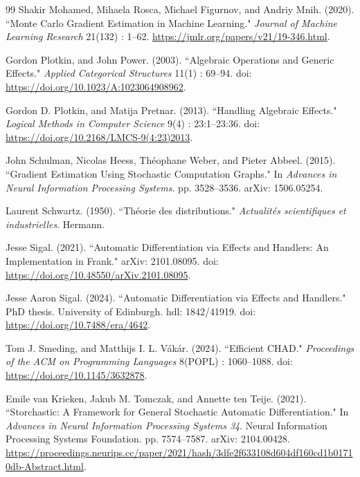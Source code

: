 \documentclass[11pt,a4paper]{article}
\theoremstyle{definition}
\theoremstyle{remark}
\begin{document}
\begin{thebibliography}{99}
Shakir Mohamed, Mihaela Rosca, Michael Figurnov, and Andriy Mnih. (2020). ``Monte Carlo Gradient Estimation in Machine Learning." \emph{Journal of Machine Learning Research} 21(132) : 1--62. \url{https://jmlr.org/papers/v21/19-346.html}.

Gordon Plotkin, and John Power. (2003). ``Algebraic Operations and Generic Effects." \emph{Applied Categorical Structures} 11(1) : 69--94. doi: \url{https://doi.org/10.1023/A:1023064908962}.

Gordon D. Plotkin, and Matija Pretnar. (2013). ``Handling Algebraic Effects." \emph{Logical Methods in Computer Science} 9(4) : 23:1--23:36. doi: \url{https://doi.org/10.2168/LMCS-9(4:23)2013}.


John Schulman, Nicolas Heess, Théophane Weber, and Pieter Abbeel. (2015). ``Gradient Estimation Using Stochastic Computation Graphs." In \emph{Advances in Neural Information Processing Systems}. pp. 3528--3536. arXiv: 1506.05254.

Laurent Schwartz. (1950). ``Théorie des distributions." \emph{Actualités scientifiques et industrielles}. Hermann.

Jesse Sigal. (2021). ``Automatic Differentiation via Effects and Handlers: An Implementation in Frank." arXiv: 2101.08095. doi: \url{https://doi.org/10.48550/arXiv.2101.08095}.

Jesse Aaron Sigal. (2024). ``Automatic Differentiation via Effects and Handlers." PhD thesis. University of Edinburgh. hdl: 1842/41919. doi: \url{https://doi.org/10.7488/era/4642}.

Tom J. Smeding, and Matthijs I. L. Vákár. (2024). ``Efficient CHAD." \emph{Proceedings of the ACM on Programming Languages} 8(POPL) : 1060--1088. doi: \url{https://doi.org/10.1145/3632878}.

Emile van Krieken, Jakub M. Tomczak, and Annette ten Teije. (2021). ``Storchastic: A Framework for General Stochastic Automatic Differentiation." In \emph{Advances in Neural Information Processing Systems 34}. Neural Information Processing Systems Foundation. pp. 7574--7587. arXiv: 2104.00428. \url{https://proceedings.neurips.cc/paper/2021/hash/3dfe2f633108d604df160cd1b01710db-Abstract.html}.


\end{thebibliography}
\end{document}
